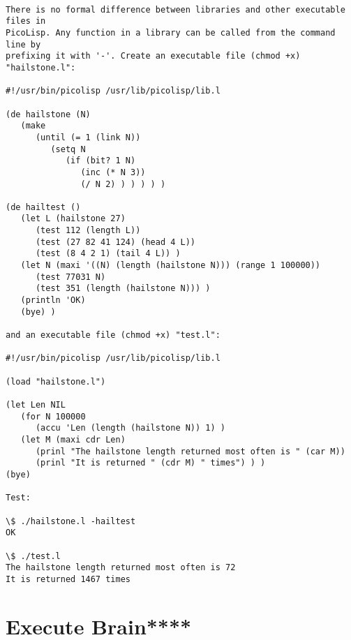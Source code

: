 \begin{verbatim}

There is no formal difference between libraries and other executable files in
PicoLisp. Any function in a library can be called from the command line by
prefixing it with '-'. Create an executable file (chmod +x) "hailstone.l":

#!/usr/bin/picolisp /usr/lib/picolisp/lib.l

(de hailstone (N)
   (make
      (until (= 1 (link N))
         (setq N
            (if (bit? 1 N)
               (inc (* N 3))
               (/ N 2) ) ) ) ) )

(de hailtest ()
   (let L (hailstone 27)
      (test 112 (length L))
      (test (27 82 41 124) (head 4 L))
      (test (8 4 2 1) (tail 4 L)) )
   (let N (maxi '((N) (length (hailstone N))) (range 1 100000))
      (test 77031 N)
      (test 351 (length (hailstone N))) )
   (println 'OK)
   (bye) )

and an executable file (chmod +x) "test.l":

#!/usr/bin/picolisp /usr/lib/picolisp/lib.l

(load "hailstone.l")

(let Len NIL
   (for N 100000
      (accu 'Len (length (hailstone N)) 1) )
   (let M (maxi cdr Len)
      (prinl "The hailstone length returned most often is " (car M))
      (prinl "It is returned " (cdr M) " times") ) )
(bye)

Test:

\$ ./hailstone.l -hailtest
OK

\$ ./test.l
The hailstone length returned most often is 72
It is returned 1467 times

\end{verbatim}

\section*{Execute Brain****}

